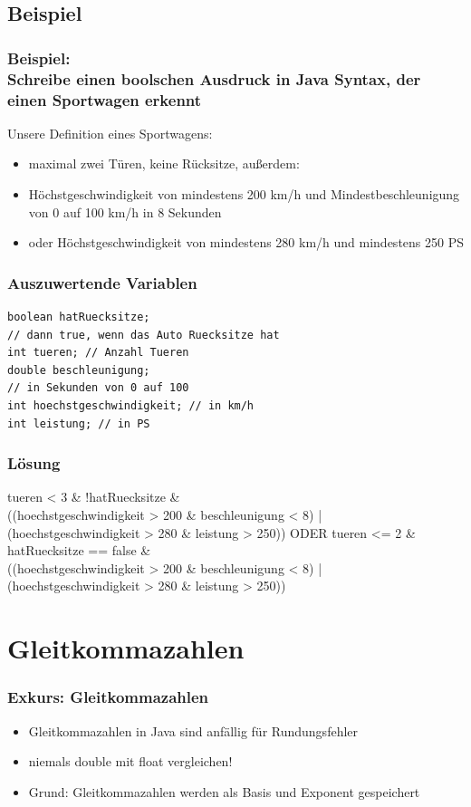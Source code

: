 \documentclass[final]{beamer}
\begin{document}
\subsection{Beispiel}
\begin{frame}
	\frametitle{Beispiel: \\Schreibe einen boolschen Ausdruck in Java Syntax, der einen Sportwagen erkennt}
	Unsere Definition eines Sportwagens:	\\
	\begin{itemize}
		\item{maximal zwei Türen, keine Rücksitze, außerdem:}
		\item{Höchstgeschwindigkeit von mindestens 200 km/h und  Mindestbeschleunigung von 0 auf 100 km/h in 8 Sekunden}
		\item{oder Höchstgeschwindigkeit von mindestens 280 km/h und mindestens 250 PS}
	\end{itemize}
\end{frame}

\begin{frame}[containsverbatim]
	\frametitle{Auszuwertende Variablen}
	\begin{lstlisting}
boolean hatRuecksitze; 
// dann true, wenn das Auto Ruecksitze hat
int tueren; // Anzahl Tueren
double beschleunigung; 
// in Sekunden von 0 auf 100
int hoechstgeschwindigkeit; // in km/h
int leistung; // in PS
	\end{lstlisting}
\end{frame}


\begin{frame}
	\frametitle{Lösung}

tueren < 3 \& !hatRuecksitze \& \\
((hoechstgeschwindigkeit > 200 \& beschleunigung < 8) | \\
(hoechstgeschwindigkeit > 280 \& leistung > 250)) 
\vfill
ODER
\vfill
tueren <= 2 \& hatRuecksitze == false \& \\
((hoechstgeschwindigkeit > 200 \& beschleunigung < 8) | \\
(hoechstgeschwindigkeit > 280 \& leistung > 250))

\end{frame}

\section{Gleitkommazahlen}
\begin{frame}
	\frametitle{Exkurs: Gleitkommazahlen}
	\begin{itemize}
		\item{Gleitkommazahlen in Java sind anfällig für Rundungsfehler}
		\item{niemals double mit float vergleichen!}
		\item{Grund: Gleitkommazahlen werden als Basis und Exponent gespeichert}
	\end{itemize}
\end{frame}
\end{document}
